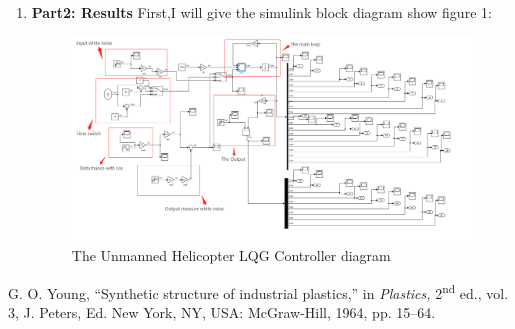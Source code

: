 \documentclass[12pt, a4paper]{article}
\begin{document}
\begin{enumerate}[1.]
\item \textbf{ Part2: Results}
First,I will give the simulink block diagram show figure 1:\\
\begin{figure}[ht]

    \centering
    \includegraphics[scale=0.6]{block_diagram.png}
    \caption{The Unmanned Helicopter LQG Controller diagram}
    \label{fig:label}
    \end{figure}
\end{enumerate}


\begin{thebibliography}{00}

     G. O. Young, ``Synthetic structure of industrial plastics,'' in \emph{Plastics,} 2\textsuperscript{nd} ed., vol. 3, J. Peters, Ed. New York, NY, USA: McGraw-Hill, 1964, pp. 15--64.
    
\end{thebibliography}
\end{document}
